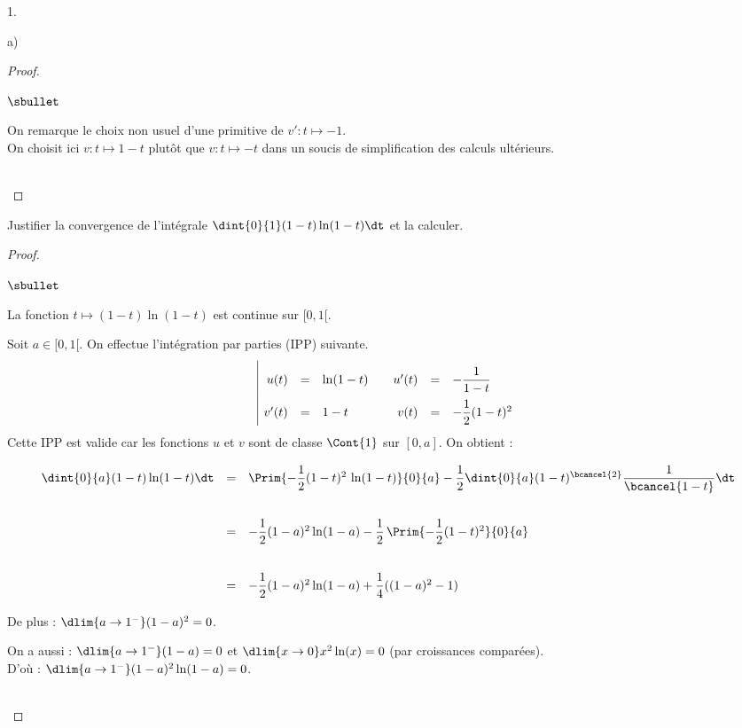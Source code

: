 \begin{noliste}{1.}
\begin{noliste}{a)}
\begin{proof}
\begin{remark}
\begin{noliste}{$\sbullet$}
      \item On remarque le choix non usuel d'une primitive de 
      $v':t \mapsto -1$.\\
      On choisit ici $v:t \mapsto 1-t$ plutôt que $v:t \mapsto -t$ 
      dans un soucis de simplification des calculs ultérieurs.
    \end{noliste}
    \end{remark}~\\[-1.4cm]
  \end{proof}
  
  
  
  \newpage
  

  
  \item Justifier la convergence de l'intégrale $\dint{0}{1} 
  (1-t)\ln(1-t) \dt$ et la calculer. 
  
  \begin{proof}~
    \begin{noliste}{$\sbullet$}
      \item La fonction $t\mapsto (1-t) \ln(1-t)$ est continue 
      sur $[0,1[$.
      \item Soit $a\in [0,1[$. On effectue l'intégration par parties 
      (IPP) suivante.
      \[
	\renewcommand{\arraystretch}{2.2}
	\begin{array}{|rcl@{\qquad}rcl}
	  u(t) & = & \ln(1-t) & u'(t) & = & - \dfrac{1}{1-t} \\
	  v'(t) & = & 1-t & v(t) & = & -\dfrac{1}{2}(1-t)^2
	\end{array}
      \]
      Cette IPP est valide car les fonctions $u$ et $v$ sont de classe 
      $\Cont{1}$ sur $[0,a]$. On obtient :
      \[
        \begin{array}{rcl}
          \dint{0}{a} (1-t) \ln(1-t) \dt &=& \Prim{-\dfrac{1}{2}
          (1-t)^2 \, \ln(1-t)}{0}{a} - \dfrac{1}{2} \dint{0}{a} 
          (1-t)^{\bcancel{2}} \dfrac{1}{\bcancel{1-t}} \dt
          \\[.6cm]
          &=& - \dfrac{1}{2} (1-a)^2 \ln(1-a) - \dfrac{1}{2} 
          \, \Prim{-\dfrac{1}{2}(1-t)^2}{0}{a}
          \\[.6cm]
          &=& - \dfrac{1}{2}(1-a)^2 \ln(1-a) + \dfrac{1}{4}((1-a)^2
          -1)
        \end{array}
      \]
    
      \item De plus : $\dlim{a \to 1^-} (1-a)^2=0$.
      \item On a aussi : $\dlim{a\to 1^-} (1-a)=0$ et 
      $\dlim{x\to 0} x^2\ln(x)=0$ (par croissances comparées).\\[.1cm]
      D'où : $\dlim{a\to 1^-} (1-a)^2 \ln(1-a)=0$.
    \end{noliste}
    ~\\[-1cm]
  \end{proof}
  

\end{noliste}
\end{noliste}
